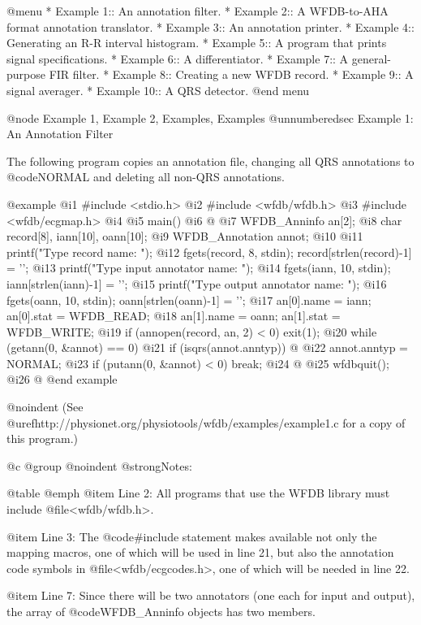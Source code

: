 {{{{{{{{{@menu
* Example 1::			An annotation filter.
* Example 2::			A WFDB-to-AHA format annotation translator.
* Example 3::			An annotation printer.
* Example 4::			Generating an R-R interval histogram.
* Example 5::			A program that prints signal specifications.
* Example 6::			A differentiator.
* Example 7::			A general-purpose FIR filter.
* Example 8::			Creating a new WFDB record.
* Example 9::			A signal averager.
* Example 10::			A QRS detector.
@end menu

@node     Example 1, Example 2, Examples, Examples
@unnumberedsec Example 1:  An Annotation Filter

The following program copies an annotation file, changing all QRS annotations
to @code{NORMAL} and deleting all non-QRS annotations.

@example
 @i{1}  #include <stdio.h>
 @i{2}  #include <wfdb/wfdb.h>
 @i{3}  #include <wfdb/ecgmap.h>
 @i{4}
 @i{5}  main()
 @i{6}  @{
 @i{7}      WFDB_Anninfo an[2];
 @i{8}      char record[8], iann[10], oann[10];
 @i{9}      WFDB_Annotation annot;
@i{10}
@i{11}      printf("Type record name: ");
@i{12}      fgets(record, 8, stdin); record[strlen(record)-1] = '\0';
@i{13}      printf("Type input annotator name: ");
@i{14}      fgets(iann, 10, stdin); iann[strlen(iann)-1] = '\0';
@i{15}      printf("Type output annotator name: ");
@i{16}      fgets(oann, 10, stdin); oann[strlen(oann)-1] = '\0';
@i{17}      an[0].name = iann; an[0].stat = WFDB_READ;
@i{18}      an[1].name = oann; an[1].stat = WFDB_WRITE;
@i{19}      if (annopen(record, an, 2) < 0) exit(1);
@i{20}      while (getann(0, &annot) == 0)
@i{21}          if (isqrs(annot.anntyp)) @{
@i{22}              annot.anntyp = NORMAL;
@i{23}              if (putann(0, &annot) < 0) break;
@i{24}          @}
@i{25}      wfdbquit();
@i{26}  @}
@end example

@noindent
(See @uref{http://physionet.org/physiotools/wfdb/examples/example1.c}
for a copy of this program.)

@c @group
@noindent
@strong{Notes:}

@table @emph
@item Line 2:
All programs that use the WFDB library must include
@file{<wfdb/wfdb.h>}.

@item Line 3:
The @code{#include} statement makes available not only the mapping
macros, one of which will be used in line 21, but also the
annotation code symbols in @file{<wfdb/ecgcodes.h>}, one of which
will be needed in line 22.

@item Line 7:
Since there will be two annotators (one each for input and output),
the array of @code{WFDB_Anninfo} objects has two members.

}}}}}}}}}
